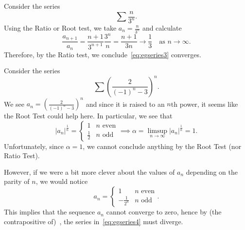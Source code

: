 \begin{eg}
	Consider the series
	\begin{equation}
		\label{eq:egseries3}
		\sum \frac{n}{3^n}.
	\end{equation}
	Using the Ratio or Root test, we take $a_n = \frac{n}{3^n}$ and calculate
	\[
	\frac{a_{n+1}}{a_n}=\frac{n+1}{3^{n+1}}\frac{3^n}{n} = \frac{n+1}{3n} \to \frac{1}{3}\quad \text{as }n\to\infty.
	\]
	Therefore, by the Ratio test, we conclude~\eqref{eq:egseries3} converges.
\end{eg}
\begin{eg}
	Consider the series
	\begin{equation}
		\label{eq:egseries4}
		\sum\left(
		\frac{2}{(-1)^n-3}
		\right)^n.
	\end{equation}
	We see $a_n = \left(
	\frac{2}{(-1)^n-3}
	\right)^n$ and since it is raised to an $n$th power, it seems like the Root Test could help here. In particular, we see that
	\[
	|a_n|^\frac{1}{n} = \left\{
	\begin{array}{ll}
		1 	&n\text{ even}\\
		\frac{1}{2} 	&n\text{ odd}
	\end{array}
	\right.\implies \alpha = \limsup_{n\to\infty}|a_n|^\frac{1}{n}=1.
	\]
	Unfortunately, since $\alpha =1$, we cannot conclude anything by the Root Test (nor Ratio Test).
	
	However, if we were a bit more clever about the values of $a_n$ depending on the parity of $n$, we would notice
	\[
	a_n = \left\{
	\begin{array}{cl}
		1 	&n\text{ even} 	\\
		-\frac{1}{2^n} 	&n\text{ odd}
	\end{array}
	\right..
	\]
	This implies that the sequence $a_n$ cannot converge to zero, hence by (the contrapositive of)~, the series in~\eqref{eq:egseries4} must diverge.
\end{eg}
